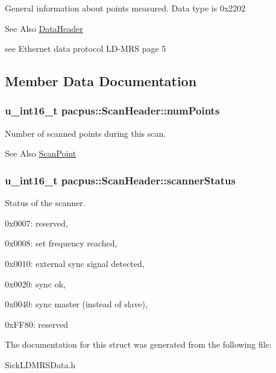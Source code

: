 General information about points measured. Data type is 0x2202 \begin{DoxySeeAlso}{See Also}
\hyperlink{structpacpus_1_1DataHeader}{Data\-Header}
\end{DoxySeeAlso}
see Ethernet data protocol L\-D-\/\-M\-R\-S page 5 

\subsection{Member Data Documentation}
\hypertarget{structpacpus_1_1ScanHeader_a92f397bf893b9869c8847eb4a39a8005}{
\subsubsection[{num\-Points}]{\setlength{\rightskip}{0pt plus 5cm}u\-\_\-int16\-\_\-t pacpus\-::\-Scan\-Header\-::num\-Points}}\label{structpacpus_1_1ScanHeader_a92f397bf893b9869c8847eb4a39a8005}


Number of scanned points during this scan. 

\begin{DoxySeeAlso}{See Also}
\hyperlink{structpacpus_1_1ScanPoint}{Scan\-Point} 
\end{DoxySeeAlso}
\hypertarget{structpacpus_1_1ScanHeader_aad5f68bdf71fe32c0325f69919355aa7}{
\subsubsection[{scanner\-Status}]{\setlength{\rightskip}{0pt plus 5cm}u\-\_\-int16\-\_\-t pacpus\-::\-Scan\-Header\-::scanner\-Status}}\label{structpacpus_1_1ScanHeader_aad5f68bdf71fe32c0325f69919355aa7}


Status of the scanner. 


\begin{DoxyItemize}
\item 0x0007\-: reserved,
\item 0x0008\-: set frequency reached,
\item 0x0010\-: external sync signal detected,
\item 0x0020\-: sync ok,
\item 0x0040\-: sync master (instead of slave),
\item 0x\-F\-F80\-: reserved 
\end{DoxyItemize}

The documentation for this struct was generated from the following file\-:\begin{DoxyCompactItemize}
\item 
Sick\-L\-D\-M\-R\-S\-Data.\-h\end{DoxyCompactItemize}
